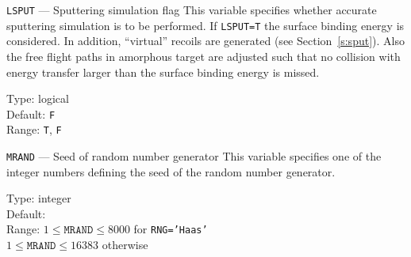 \begin{keydescription}{\texttt{LSPUT} --- Sputtering simulation flag}
%
  This variable specifies whether accurate sputtering simulation is to be
  performed. If \texttt{LSPUT=T} the surface binding energy is
  considered. In addition, ``virtual'' recoils are generated (see 
  Section~\ref{s:sput}). Also the free flight paths in amorphous target are 
  adjusted such that no collision with energy transfer larger than the surface 
  binding energy is missed.
%
  \begin{keytab}
    Type:    \> logical \\
    Default: \> \texttt{F} \\
    Range:   \> \texttt{T}, \texttt{F}
  \end{keytab}
\end{keydescription}

\begin{keydescription}{\texttt{MRAND} --- Seed of random number generator}
%
  This variable specifies one of the integer numbers defining the seed of
  the random number generator.
%
  \begin{keytab}
    Type:    \> integer \\
    Default:  \\
    Range:   \> $1 \le \texttt{MRAND} \le 8000$ for \texttt{RNG='Haas'} \\
             \> $1 \le \texttt{MRAND} \le 16383$ otherwise
  \end{keytab}
\end{keydescription}

